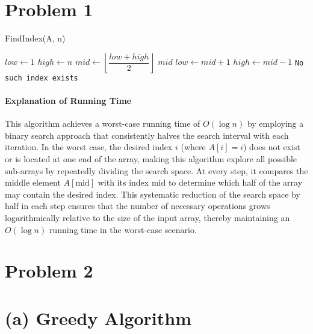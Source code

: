 \documentclass[12pt]{article}
\begin{document}
\section*{Problem 1}
\begin{algorithm}
\caption{FindIndex(A, n)}
\begin{algorithmic}[1]
    \State $low \gets 1$
    \State $high \gets n$
        \State $mid \gets \left\lfloor \dfrac{low + high}{2} \right\rfloor$
            \State \Return $mid$
            \State $low \gets mid + 1$
        \Else
            \State $high \gets mid - 1$
        \EndIf
    \EndWhile
    \State \Return \texttt{No such index exists}
\EndFunction
\end{algorithmic}
\end{algorithm}

\paragraph{Explanation of Running Time}

This algorithm achieves a worst-case running time of \( O(\log n) \) by employing a binary search approach that consistently halves the search interval with each iteration. In the worst case, the desired index \( i \) (where \( A[i] = i \)) does not exist or is located at one end of the array, making this algorithm explore all possible sub-arrays by repeatedly dividing the search space. At every step, it compares the middle element \( A[\text{mid}] \) with its index \( \text{mid} \) to determine which half of the array may contain the desired index. This systematic reduction of the search space by half in each step ensures that the number of necessary operations grows logarithmically relative to the size of the input array, thereby maintaining an \( O(\log n) \) running time in the worst-case scenario.

\newpage

\section*{Problem 2}

\section*{(a) Greedy Algorithm}
\end{document}
